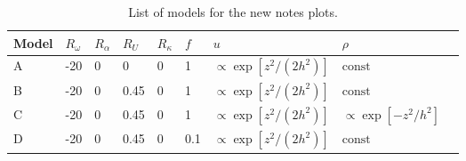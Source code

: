 \documentclass[a4paper,10pt]{article}
\newcommand{\1}{_\mathrm{1}}					   	%
\newcommand{\2}{_\mathrm{2}}					   	%
\newcommand{\const}{\mathrm{const}}			   	%
\begin{document}
\begin{table}


\begin{center}
\caption{List of models for the new notes plots.}
\label{tab:models}
\begin{tabular}{lllllllll}
\hline
Model     &$R_\omega$   &$R_\alpha$   &$R_U$   &$R_\kappa$    &$f$      &$u$                          &$\rho$                     \\
\hline
A         &-20          &0            &0       &0             &1        &$\propto\exp[z^2/(2h^2)]$   &$\const$                   \\        
B         &-20          &0            &0.45    &0             &1        &$\propto\exp[z^2/(2h^2)]$   &$\const$                   \\  
C         &-20          &0            &0.45    &0             &1        &$\propto\exp[z^2/(2h^2)]$   &$\propto\exp[-z^2/h^2]$    \\ 
D         &-20          &0            &0.45    &0             &0.1      &$\propto\exp[z^2/(2h^2)]$   &$\const$                   \\  
\hline
\end{tabular}
\end{center}
\end{table}
%
\maketitle




\label{lastpage}
\end{document}
